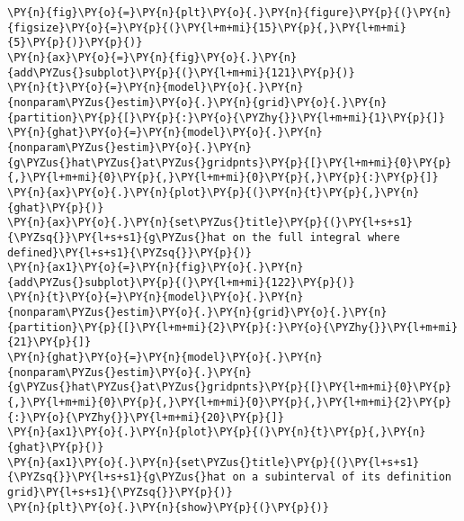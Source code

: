 \documentclass[10pt, article,table]{article}
\begin{document}
    \begin{tcolorbox}[breakable, size=fbox, boxrule=1pt, pad at break*=1mm,colback=cellbackground, colframe=cellborder]
\begin{Verbatim}[commandchars=\\\{\}]
\PY{n}{fig}\PY{o}{=}\PY{n}{plt}\PY{o}{.}\PY{n}{figure}\PY{p}{(}\PY{n}{figsize}\PY{o}{=}\PY{p}{(}\PY{l+m+mi}{15}\PY{p}{,}\PY{l+m+mi}{5}\PY{p}{)}\PY{p}{)}
\PY{n}{ax}\PY{o}{=}\PY{n}{fig}\PY{o}{.}\PY{n}{add\PYZus{}subplot}\PY{p}{(}\PY{l+m+mi}{121}\PY{p}{)}
\PY{n}{t}\PY{o}{=}\PY{n}{model}\PY{o}{.}\PY{n}{nonparam\PYZus{}estim}\PY{o}{.}\PY{n}{grid}\PY{o}{.}\PY{n}{partition}\PY{p}{[}\PY{p}{:}\PY{o}{\PYZhy{}}\PY{l+m+mi}{1}\PY{p}{]}
\PY{n}{ghat}\PY{o}{=}\PY{n}{model}\PY{o}{.}\PY{n}{nonparam\PYZus{}estim}\PY{o}{.}\PY{n}{g\PYZus{}hat\PYZus{}at\PYZus{}gridpnts}\PY{p}{[}\PY{l+m+mi}{0}\PY{p}{,}\PY{l+m+mi}{0}\PY{p}{,}\PY{l+m+mi}{0}\PY{p}{,}\PY{p}{:}\PY{p}{]}
\PY{n}{ax}\PY{o}{.}\PY{n}{plot}\PY{p}{(}\PY{n}{t}\PY{p}{,}\PY{n}{ghat}\PY{p}{)}
\PY{n}{ax}\PY{o}{.}\PY{n}{set\PYZus{}title}\PY{p}{(}\PY{l+s+s1}{\PYZsq{}}\PY{l+s+s1}{g\PYZus{}hat on the full integral where defined}\PY{l+s+s1}{\PYZsq{}}\PY{p}{)}
\PY{n}{ax1}\PY{o}{=}\PY{n}{fig}\PY{o}{.}\PY{n}{add\PYZus{}subplot}\PY{p}{(}\PY{l+m+mi}{122}\PY{p}{)}
\PY{n}{t}\PY{o}{=}\PY{n}{model}\PY{o}{.}\PY{n}{nonparam\PYZus{}estim}\PY{o}{.}\PY{n}{grid}\PY{o}{.}\PY{n}{partition}\PY{p}{[}\PY{l+m+mi}{2}\PY{p}{:}\PY{o}{\PYZhy{}}\PY{l+m+mi}{21}\PY{p}{]}
\PY{n}{ghat}\PY{o}{=}\PY{n}{model}\PY{o}{.}\PY{n}{nonparam\PYZus{}estim}\PY{o}{.}\PY{n}{g\PYZus{}hat\PYZus{}at\PYZus{}gridpnts}\PY{p}{[}\PY{l+m+mi}{0}\PY{p}{,}\PY{l+m+mi}{0}\PY{p}{,}\PY{l+m+mi}{0}\PY{p}{,}\PY{l+m+mi}{2}\PY{p}{:}\PY{o}{\PYZhy{}}\PY{l+m+mi}{20}\PY{p}{]}
\PY{n}{ax1}\PY{o}{.}\PY{n}{plot}\PY{p}{(}\PY{n}{t}\PY{p}{,}\PY{n}{ghat}\PY{p}{)}
\PY{n}{ax1}\PY{o}{.}\PY{n}{set\PYZus{}title}\PY{p}{(}\PY{l+s+s1}{\PYZsq{}}\PY{l+s+s1}{g\PYZus{}hat on a subinterval of its definition grid}\PY{l+s+s1}{\PYZsq{}}\PY{p}{)}
\PY{n}{plt}\PY{o}{.}\PY{n}{show}\PY{p}{(}\PY{p}{)}
\end{Verbatim}
\end{tcolorbox}

    \begin{center}
    \end{center}
    { \hspace*{\fill} \\}
    
\end{document}

